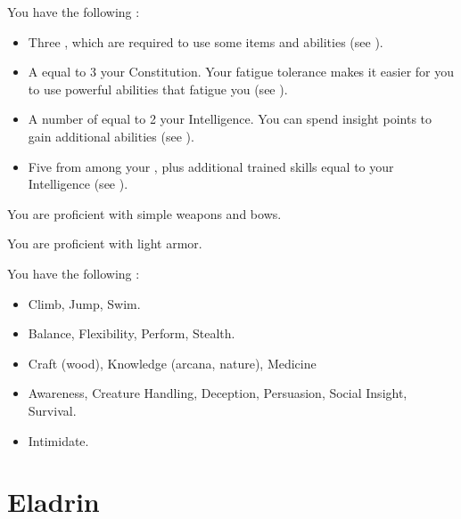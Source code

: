  You have the following :
\begin{itemize}
	\item Three , which are required to use some items and abilities (see ).
	\item A  equal to 3 \add your Constitution.
	      Your fatigue tolerance makes it easier for you to use powerful abilities that fatigue you (see ).
	\item A number of  equal to 2 \add your Intelligence.
	      You can spend insight points to gain additional abilities (see ).
	\item Five  from among your , plus additional trained skills equal to your Intelligence (see ).
\end{itemize}

You are proficient with simple weapons and bows.

You are proficient with light armor.

You have the following :
\begin{itemize}
	\item {} Climb, Jump, Swim.
	\item {} Balance, Flexibility, Perform, Stealth.
	\item {} Craft (wood), Knowledge (arcana, nature), Medicine
	\item {} Awareness, Creature Handling, Deception, Persuasion, Social Insight, Survival.
	\item {} Intimidate.
\end{itemize}

\section{Eladrin}

